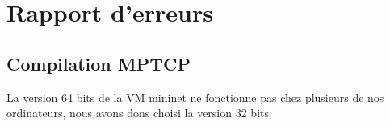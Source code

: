
\section{Rapport d'erreurs}
\label{sec:annexe2:bug}

\subsection{Compilation MPTCP}
\label{sec:a2:compilation_mptcp}
La version 64 bits de la VM mininet ne fonctionne pas chez plusieurs de nos ordinateurs, nous avons dons choisi la version 32 bits

